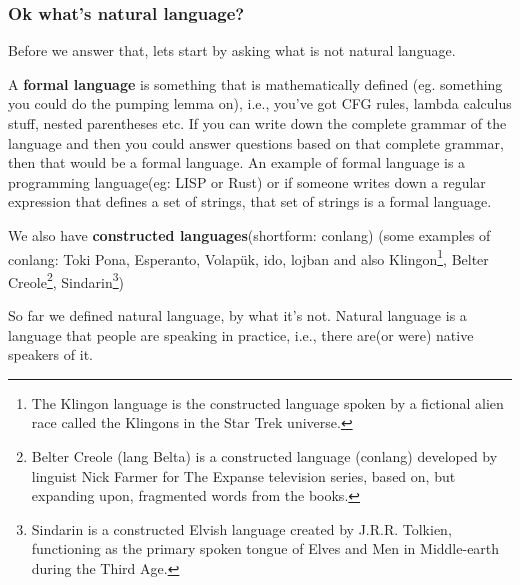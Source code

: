 \documentclass[11pt]{article}
\begin{document}
\subsubsection{Ok what's natural language?}
Before we answer that, lets start by asking what is not natural language.

A \textbf{formal language} is something that is mathematically defined (eg. something you could do the pumping lemma on), i.e., you've got CFG rules, lambda calculus stuff, nested parentheses etc. If you can write down the complete grammar of the language and then you could answer questions based on that complete grammar, then that would be a formal language. An example of formal language is a programming language(eg: LISP or Rust) or if someone writes down a regular expression that defines a set of strings, that set of strings is a formal language. 



We also have \textbf{constructed languages}(shortform: conlang) (some examples of conlang: Toki Pona, Esperanto, Volapük, ido, lojban and also Klingon\footnote{The Klingon language is the constructed language spoken by a fictional alien race called the Klingons in the Star Trek universe.}, Belter Creole\footnote{Belter Creole (lang Belta) is a constructed language (conlang) developed by linguist Nick Farmer for The Expanse television series, based on, but expanding upon, fragmented words from the books.}, Sindarin\footnote{Sindarin is a constructed Elvish language created by J.R.R. Tolkien, functioning as the primary spoken tongue of Elves and Men in Middle-earth during the Third Age.})

So far we defined natural language, by what it's not. Natural language is a language that people are speaking in practice, i.e., there are(or were) native speakers of it.
\end{document}
